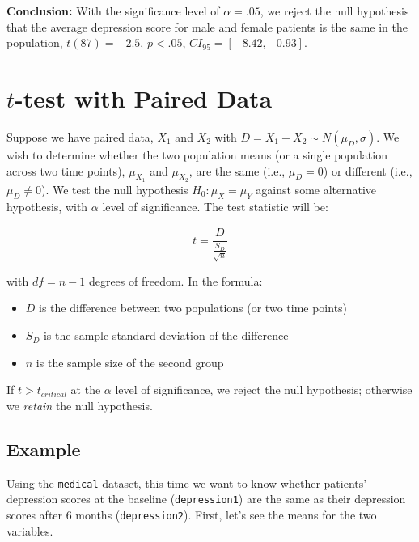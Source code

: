 \documentclass[]{book}
\newenvironment{Shaded}{\begin{snugshade}}{\end{snugshade}}
\newcommand{\KeywordTok}[1]{\textcolor[rgb]{0.13,0.29,0.53}{\textbf{#1}}}
\newcommand{\NormalTok}[1]{#1}
\newcommand{\OperatorTok}[1]{\textcolor[rgb]{0.81,0.36,0.00}{\textbf{#1}}}
\providecommand{\tightlist}{%
  \setlength{\itemsep}{0pt}\setlength{\parskip}{0pt}}
\begin{document}
\textbf{Conclusion:} With the significance level of \(\alpha=.05\), we reject the null hypothesis that the average depression score for male and female patients is the same in the population, \(t(87)=-2.5\), \(p < .05\), \(CI_{95}=[-8.42, -0.93]\).

\hypertarget{t-test-with-paired-data}{%
\section{\texorpdfstring{\(t\)-test with Paired Data}{t-test with Paired Data}}\label{t-test-with-paired-data}}

Suppose we have paired data, \(X_1\) and \(X_2\) with \(D=X_1-X_2 \sim N(\mu_D, \sigma)\). We wish to determine whether the two population means (or a single population across two time points), \(\mu_{X_1}\) and \(\mu_{X_2}\), are the same (i.e., \(\mu_D = 0\)) or different (i.e., \(\mu_D \neq 0\)). We test the null hypothesis \(H_0: \mu_X = \mu_Y\) against some alternative hypothesis, with \(\alpha\) level of significance. The test statistic will be:

\[t = \frac{\bar{D}}{\frac{S_D}{\sqrt{n}}}\]

with \(df = n -1\) degrees of freedom. In the formula:

\begin{itemize}
\tightlist
\item
  \(D\) is the difference between two populations (or two time points)
\item
  \(S_D\) is the sample standard deviation of the difference
\item
  \(n\) is the sample size of the second group
\end{itemize}

If \(t > t_{critical}\) at the \(\alpha\) level of significance, we reject the null hypothesis; otherwise we \emph{retain} the null hypothesis.

\hypertarget{example-2}{%
\subsection{Example}\label{example-2}}

Using the \texttt{medical} dataset, this time we want to know whether patients' depression scores at the baseline (\texttt{depression1}) are the same as their depression scores after 6 months (\texttt{depression2}). First, let's see the means for the two variables.

\begin{Shaded}
\end{Shaded}
\end{document}
